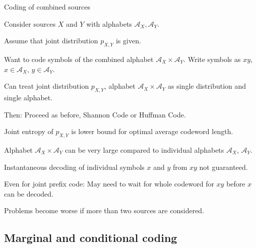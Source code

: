 \begin{frame}{Coding of combined sources}
\bit
\item Consider sources $X$ and $Y$ with alphabets $\mathcal{A}_X,  \mathcal{A}_Y$.
\item Assume that joint distribution $p_{X,Y}$ is given.
\item Want to code symbols of the combined alphabet $\mathcal{A}_X\times \mathcal{A}_Y$. Write symbols as $xy$, $x\in\mathcal{A}_X$, $y\in\mathcal{A}_Y$. 
\eit

\bit
\item Can treat joint distribution $p_{X,Y}$, alphabet $\mathcal{A}_X\times\mathcal{A}_Y$ as single distribution and single alphabet. 
\item Then: Proceed as before, Shannon Code or Huffman Code.
\item Joint entropy of  $p_{X,Y}$ is lower bound for optimal average codeword length. 
\eit
{}
\bit
\item Alphabet $\mathcal{A}_X\times\mathcal{A}_Y$ can be very large compared to individual alphabets $\mathcal{A}_X$, $\mathcal{A}_Y$. 
\item Instantaneous decoding of individual symbols $x$ and $y$ from $xy$ not guaranteed.
\item Even for joint prefix code: May need to wait for whole codeword for $xy$ before $x$ can be decoded. 
\item Problems become worse if more than two sources are considered. 
\eit 
\end{frame}

\subsection{Marginal and conditional coding}


